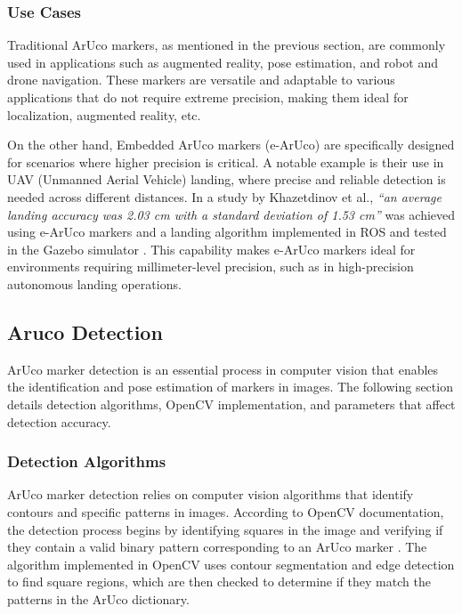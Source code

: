     \subsubsection{Use Cases}

    Traditional ArUco markers, as mentioned in the previous section, are commonly used in applications such as augmented reality, pose estimation, and robot and drone navigation. These markers are versatile and adaptable to various applications that do not require extreme precision, making them ideal for localization, augmented reality, etc.

    On the other hand, Embedded ArUco markers (e-ArUco) are specifically designed for scenarios where higher precision is critical. A notable example is their use in UAV (Unmanned Aerial Vehicle) landing, where precise and reliable detection is needed across different distances. In a study by Khazetdinov et al., \textit{“an average landing accuracy was 2.03 cm with a standard deviation of 1.53 cm”} was achieved using e-ArUco markers and a landing algorithm implemented in ROS and tested in the Gazebo simulator \cite{khazetdinov2021}. This capability makes e-ArUco markers ideal for environments requiring millimeter-level precision, such as in high-precision autonomous landing operations.

\subsection{Aruco Detection}
    ArUco marker detection is an essential process in computer vision that enables the identification and pose estimation of markers in images. The following section details detection algorithms, OpenCV implementation, and parameters that affect detection accuracy.

    \subsubsection{Detection Algorithms}

    ArUco marker detection relies on computer vision algorithms that identify contours and specific patterns in images. According to OpenCV documentation, the detection process begins by identifying squares in the image and verifying if they contain a valid binary pattern corresponding to an ArUco marker \cite{opencv_docs_aruco}. The algorithm implemented in OpenCV uses contour segmentation and edge detection to find square regions, which are then checked to determine if they match the patterns in the ArUco dictionary.

